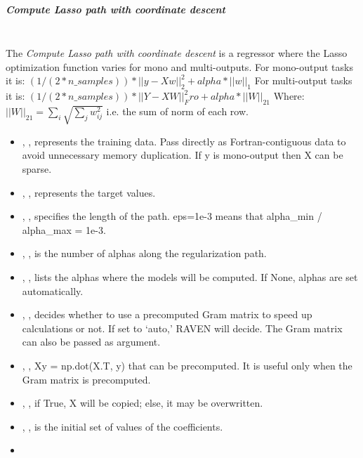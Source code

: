 \subparagraph{Compute Lasso path with coordinate descent}
\mbox{}
\\The \textit{Compute Lasso path with coordinate descent} is a regressor where
the Lasso optimization function varies for mono and multi-outputs.
%
For mono-output tasks it is:
$(1 / (2 * n\_samples)) * ||y - Xw||^2_2 + alpha * ||w||_1$
For multi-output tasks it is:
$(1 / (2 * n\_samples)) * ||Y - XW||^2_Fro + alpha * ||W||_21$
Where:
$||W||_21 = \sum_i \sqrt{\sum_j w_{ij}^2}$
i.e. the sum of norm of each row.
%
\begin{itemize}
  \item {}, , represents the training data.
  Pass directly as Fortran-contiguous data to avoid unnecessary memory
  duplication.
  If y is mono-output then X can be sparse.
  \item {}, , represents the target values.
  \item {}, , specifies the length of
  the path.
  eps=1e-3 means that alpha\_min / alpha\_max = 1e-3.
  \item {}, , is the number of
  alphas along the regularization path.
  \item {}, , lists the alphas
  where the models will be computed.
  If None, alphas are set automatically.
  \item {}, ,
  decides whether to use a precomputed Gram matrix to speed up calculations or
  not.
  If set to `auto,' RAVEN will decide.
  The Gram matrix can also be passed as argument.
  \item {}, ,
  Xy = np.dot(X.T, y) that can be precomputed.
  It is useful only when the Gram matrix is precomputed.
  \item {}, , if True, X will be
  copied; else, it may be overwritten.
  \item {}, , is
  the initial set of values of the coefficients.
  \item \verDescriptionB{}
\end{itemize}

